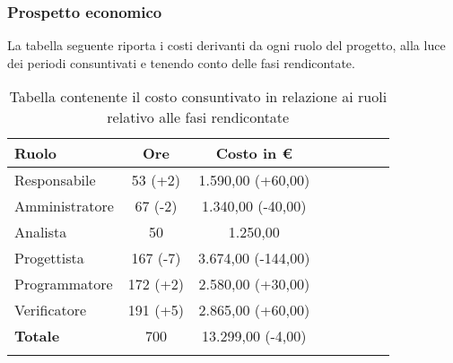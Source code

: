 \subsubsection{Prospetto economico}
La tabella seguente riporta i costi derivanti da ogni ruolo del progetto, alla luce dei periodi consuntivati e tenendo conto delle fasi rendicontate.

\begin{longtable}{|l|c|c|c|c|c|c|c|}
	\hline
	\rowcolor{lighter-grayer}
	\textbf{Ruolo}  & \textbf{Ore} & \textbf{Costo in €} \\
	\hline
	\endfirsthead

	\hline
	Responsabile    & 53 (+2)           & 1.590,00 (+60,00)           \\
	\hline
	\hline
	Amministratore  & 67 (-2)           & 1.340,00 (-40,00)           \\
	\hline
	\hline
	Analista        & 50           & 1.250,00            \\
	\hline
	\hline
	Progettista     & 167 (-7)          & 3.674,00 (-144,00)           \\
	\hline
	\hline
	Programmatore   & 172 (+2)         & 2.580,00 (+30,00)           \\
	\hline
	\hline
	Verificatore    & 191 (+5)         & 2.865,00 (+60,00)           \\
	\hline
	\hline
	\textbf{Totale} & 700          & 13.299,00 (-4,00)           \\
	\hline
	\rowcolor{white}
	\caption{Tabella contenente il costo consuntivato in relazione ai ruoli relativo alle fasi rendicontate}
\end{longtable}


